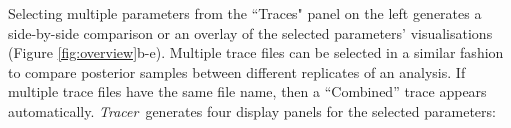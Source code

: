 \documentclass[webpdf,mynatbib,nosurname,nogrid,noCE,noMSC]{SYS}
\newcommand{\tracer}{\emph{Tracer}}
\begin{document}

Selecting multiple parameters from the ``Traces" panel on the left generates a side-by-side comparison or an overlay of the selected parameters' visualisations (Figure \ref{fig:overview}b-e).
Multiple trace files can be selected in a similar fashion to compare posterior samples between different replicates of an analysis.
If multiple trace files have the same file name,  then a ``Combined'' trace appears automatically.
\tracer\ generates four display panels for the selected parameters:
\end{document}

